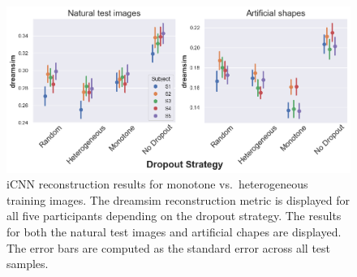 \begin{figure}[ht]
  \centering
  \includegraphics[width=1\textwidth]{plots/dropout_discussion_reconstruction_icnn.png}
  \caption[iCNN reconstruction performance monotone vs.\ heterogeneous training sample]{iCNN reconstruction results for monotone vs.\ heterogeneous training images. The dreamsim reconstruction metric is displayed for all five participants depending on the dropout strategy. The results for both the natural test images and artificial chapes are displayed. The error bars are computed as the standard error across all test samples.}\label{fig:dropout_discussion_reconstruction_icnn}
\end{figure}

